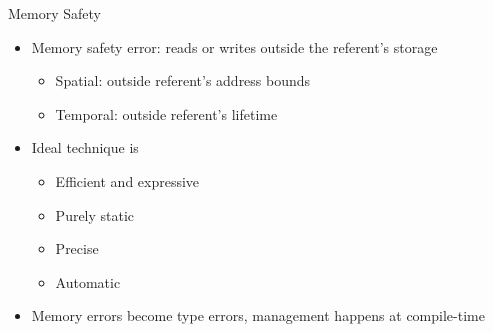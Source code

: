 \documentclass[aspectratio=169]{beamer}
\begin{document}
\begin{frame}{Memory Safety}
\begin{itemize}[<+->]
    \item Memory safety error: reads or writes outside the referent's storage
        \begin{itemize}
            \item Spatial: outside referent's \alert{address bounds}
            \item Temporal: outside referent's \alert{lifetime}
        \end{itemize}
    \item Ideal technique is
        \begin{itemize}
            \item Efficient and expressive %
            \item Purely static %
            \item Precise %
            \item Automatic %
        \end{itemize}
    \item Memory errors become \alert{type errors}, management happens at \alert{compile-time}
\end{itemize}
\end{frame}

\end{document}
